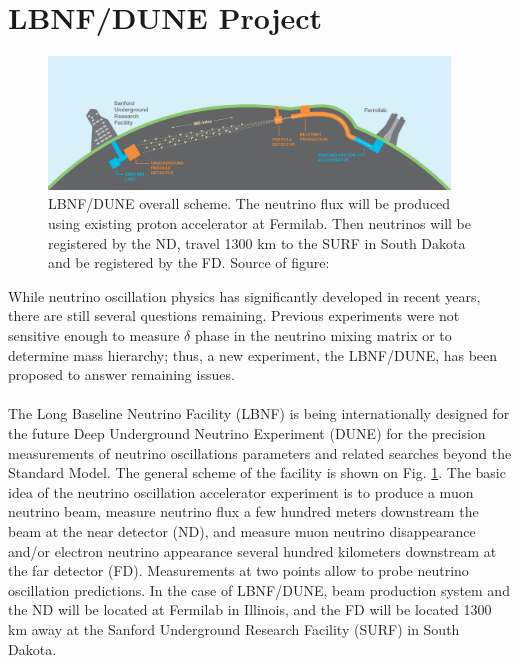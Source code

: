 
\section{LBNF/DUNE Project}
\begin{figure}
\caption{LBNF/DUNE overall scheme. The neutrino flux will be produced using existing proton accelerator at Fermilab. Then neutrinos will be registered by the ND, travel 1300 km to the SURF in South Dakota and be registered by the FD. Source of figure: \cite{ref_LBNFweb} }
\label{fig:LBNF_overallScheme}
\centering
\includegraphics[width=0.95\textwidth, keepaspectratio=true]{figs/LBNF_overallScheme.png} 
\end{figure}
While neutrino oscillation physics has significantly developed in recent years, there are still several questions remaining. Previous experiments were not sensitive enough to measure $\delta$ phase in the neutrino mixing matrix or to determine mass hierarchy; thus, a new experiment, the LBNF/DUNE, has been proposed to answer remaining issues.\\ \\
The Long Baseline Neutrino Facility (LBNF) is being internationally designed for the future Deep Underground Neutrino Experiment (DUNE) for the precision measurements of neutrino oscillations parameters and related searches beyond the Standard Model. The general scheme of the facility is shown on Fig. \ref{fig:LBNF_overallScheme}. The basic idea of the neutrino oscillation accelerator experiment is to produce a muon neutrino beam, measure neutrino flux a few hundred meters downstream the beam at the near detector (ND), and measure muon neutrino disappearance and/or electron neutrino appearance several hundred kilometers downstream at the far detector (FD). Measurements at two points allow to probe neutrino oscillation predictions. In the case of LBNF/DUNE, beam production system and the ND will be located at Fermilab in Illinois, and the FD will be located 1300 km away at the Sanford Underground Research Facility (SURF) in South Dakota. \\ \\

